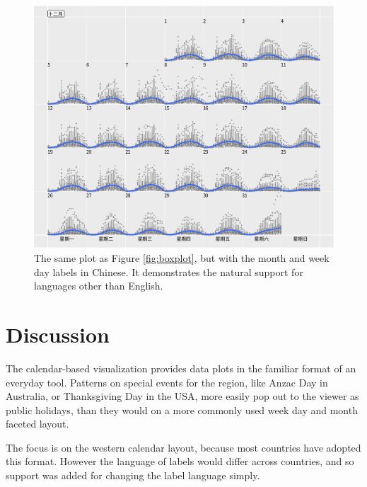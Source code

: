 \documentclass[article]{jss}
\theoremstyle{definition}
\theoremstyle{definition}
\theoremstyle{definition}
\theoremstyle{remark}
\begin{document}
\begin{CodeChunk}
\begin{figure}

{\centering \includegraphics[width=\textwidth]{figure/chn-1} 

}

\caption[The same plot as Figure \ref{fig:boxplot}, but with the
month and week day labels in Chinese. It demonstrates the natural
support for languages other than English.]{The same plot as Figure \ref{fig:boxplot}, but with the
month and week day labels in Chinese. It demonstrates the natural
support for languages other than English.}\label{fig:chn}
\end{figure}
\end{CodeChunk}





\section{Discussion}\label{discussion}

\label{sec:discussion}

The calendar-based visualization provides data plots in the familiar
format of an everyday tool. Patterns on special events for the region,
like Anzac Day in Australia, or Thanksgiving Day in the USA, more easily
pop out to the viewer as public holidays, than they would on a more
commonly used week day and month faceted layout.

The focus is on the western calendar layout, because most countries have
adopted this format. However the language of labels would differ across
countries, and so support was added for changing the label language
simply.
\end{document}
